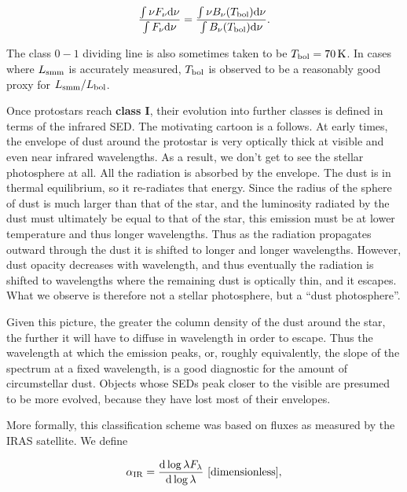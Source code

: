\documentclass[a4paper,10pt]{article}
\begin{document}
\begin{align*}
    \frac{\int\nu F_\nu {\rm d}\nu}{\int F_\nu {\rm d}\nu} = \frac{\int\nu B_\nu(T_{\rm bol}){\rm d}\nu}{\int B_\nu(T_{\rm bol}){\rm d}\nu}.
\end{align*}

{\noindent}The class $0-1$ dividing line is also sometimes taken to be $T_{\rm bol}=70\,{\rm K}$. In cases where $L_{\rm smm}$ is accurately measured, $T_{\rm bol}$ is observed to be a reasonably good proxy for $L_{\rm smm}/L_{\rm bol}$.

{\noindent}Once protostars reach \textbf{class I}, their evolution into further classes is defined in terms of the infrared SED. The motivating cartoon is a follows. At early times, the envelope of dust around the protostar is very optically thick at visible and even near infrared wavelengths. As a result, we don't get to see the stellar photosphere at all. All the radiation is absorbed by the envelope. The dust is in thermal equilibrium, so it re-radiates that energy. Since the radius of the sphere of dust is much larger than that of the star, and the luminosity radiated by the dust must ultimately be equal to that of the star, this emission must be at lower temperature and thus longer wavelengths. Thus as the radiation propagates outward through the dust it is shifted to longer and longer wavelengths. However, dust opacity decreases with wavelength, and thus eventually the radiation is shifted to wavelengths where the remaining dust is optically thin, and it escapes. What we observe is therefore not a stellar photosphere, but a ``dust photosphere''.

{\noindent}Given this picture, the greater the column density of the dust around the star, the further it will have to diffuse in wavelength in order to escape. Thus the wavelength at which the emission peaks, or, roughly equivalently, the slope of the spectrum at a fixed wavelength, is a good diagnostic for the amount of circumstellar dust. Objects whose SEDs peak closer to the visible are presumed to be more evolved, because they have lost most of their envelopes.

{\noindent}More formally, this classification scheme was based on fluxes as measured by the IRAS satellite. We define

\begin{align*}
    \alpha_{\rm IR} = \frac{{\rm d}\log\lambda F_\lambda}{{\rm d}\log \lambda} ~ [{\rm dimensionless}],
\end{align*}
\end{document}

